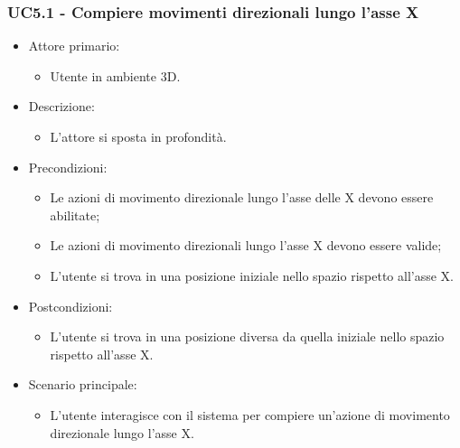 \subsubsection{UC5.1 - Compiere movimenti direzionali lungo l'asse X}
\begin{itemize}

	\item Attore primario: 
	\begin{itemize}
		\item Utente in ambiente 3D.
	\end{itemize}
	\item Descrizione:
	\begin{itemize}
		\item L'attore si sposta in profondità.
	\end{itemize}
	
	\item Precondizioni:
	\begin{itemize}
		\item Le azioni di movimento direzionale lungo l'asse delle X devono essere abilitate;
		\item Le azioni di movimento direzionali lungo l'asse X devono essere valide;
		\item L'utente si trova in una posizione iniziale nello spazio rispetto all'asse X.
	\end{itemize}
	
	\item Postcondizioni:
	\begin{itemize}
		\item L'utente si trova in una posizione diversa da quella iniziale nello spazio rispetto all'asse X.
	\end{itemize}
	
	\item Scenario principale:
	\begin{itemize}
		\item L'utente interagisce con il sistema per compiere un'azione di movimento direzionale lungo l'asse X.
	\end{itemize}
	
\end{itemize}

